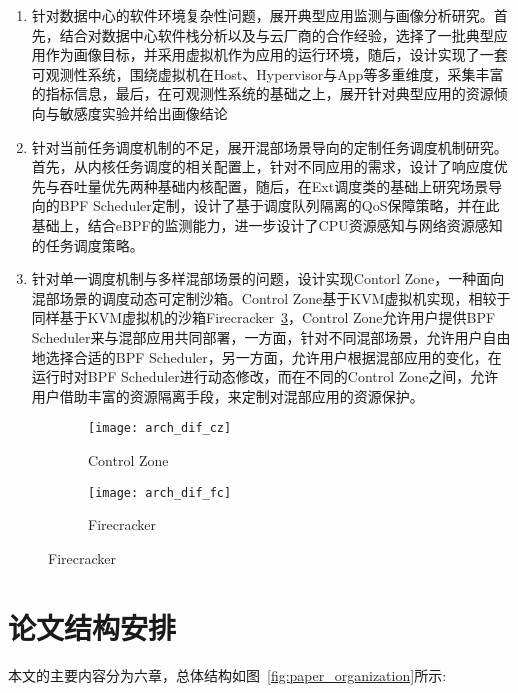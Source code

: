 \begin{enumerate}
    \item 针对数据中心的软件环境复杂性问题，展开典型应用监测与画像分析研究。首先，结合对数据中心软件栈分析以及与云厂商的合作经验，选择了一批典型应用作为画像目标，并采用虚拟机作为应用的运行环境，随后，设计实现了一套可观测性系统，围绕虚拟机在Host、Hypervisor与App等多重维度，采集丰富的指标信息，最后，在可观测性系统的基础之上，展开针对典型应用的资源倾向与敏感度实验并给出画像结论
    \item 针对当前任务调度机制的不足，展开混部场景导向的定制任务调度机制研究。首先，从内核任务调度的相关配置上，针对不同应用的需求，设计了响应度优先与吞吐量优先两种基础内核配置，随后，在Ext调度类的基础上研究场景导向的BPF Scheduler定制，设计了基于调度队列隔离的QoS保障策略，并在此基础上，结合eBPF的监测能力，进一步设计了CPU资源感知与网络资源感知的任务调度策略。
    \item 针对单一调度机制与多样混部场景的问题，设计实现Contorl Zone，一种面向混部场景的调度动态可定制沙箱。Control Zone基于KVM虚拟机实现，相较于同样基于KVM虚拟机的沙箱Firecracker~\ref{fig:arch_dif}，Control Zone允许用户提供BPF Scheduler来与混部应用共同部署，一方面，针对不同混部场景，允许用户自由地选择合适的BPF Scheduler，另一方面，允许用户根据混部应用的变化，在运行时对BPF Scheduler进行动态修改，而在不同的Control Zone之间，允许用户借助丰富的资源隔离手段，来定制对混部应用的资源保护。
\end{enumerate}

\begin{figure}[!htbp]
    \centering
    \begin{subfigure}[b]{0.45\textwidth}
        \texttt{[image: arch\_dif\_cz]}
        \caption{Control Zone}
        \label{fig:arch_dif_cz}
    \end{subfigure}
    \hfill
    \begin{subfigure}[b]{0.45\textwidth}
        \texttt{[image: arch\_dif\_fc]}
        \caption{Firecracker}
        \label{fig:arch_dif_fc}
    \end{subfigure}
\label{fig:arch_dif}
\end{figure}

\section{论文结构安排}

本文的主要内容分为六章，总体结构如图~\ref{fig:paper_organization}所示:

